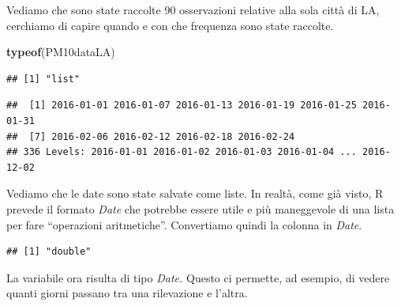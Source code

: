 \documentclass[]{book}
\newenvironment{Shaded}{\begin{snugshade}}{\end{snugshade}}
\newcommand{\DecValTok}[1]{\textcolor[rgb]{0.00,0.00,0.81}{#1}}
\newcommand{\KeywordTok}[1]{\textcolor[rgb]{0.13,0.29,0.53}{\textbf{#1}}}
\newcommand{\NormalTok}[1]{#1}
\newcommand{\OperatorTok}[1]{\textcolor[rgb]{0.81,0.36,0.00}{\textbf{#1}}}
\newcommand{\StringTok}[1]{\textcolor[rgb]{0.31,0.60,0.02}{#1}}
\begin{document}
Vediamo che sono state raccolte 90 osservazioni relative alla sola città di LA, cerchiamo di capire quando e con che frequenza sono state raccolte.

\begin{Shaded}
\begin{Highlighting}[]
\KeywordTok{typeof}\NormalTok{(PM10dataLA)}
\end{Highlighting}
\end{Shaded}

\begin{verbatim}
## [1] "list"
\end{verbatim}

\begin{Shaded}
\end{Shaded}

\begin{verbatim}
##  [1] 2016-01-01 2016-01-07 2016-01-13 2016-01-19 2016-01-25 2016-01-31
##  [7] 2016-02-06 2016-02-12 2016-02-18 2016-02-24
## 336 Levels: 2016-01-01 2016-01-02 2016-01-03 2016-01-04 ... 2016-12-02
\end{verbatim}

Vediamo che le date sono state salvate come liste. In realtà, come già visto, R prevede il formato \emph{Date} che potrebbe essere utile e più maneggevole di una lista per fare ``operazioni aritmetiche''. Convertiamo quindi la colonna in \emph{Date}.

\begin{Shaded}
\end{Shaded}

\begin{verbatim}
## [1] "double"
\end{verbatim}

La variabile ora risulta di tipo \emph{Date.} Questo ci permette, ad esempio, di vedere quanti giorni passano tra una rilevazione e l'altra.

\begin{Shaded}
\end{Shaded}
\end{document}
